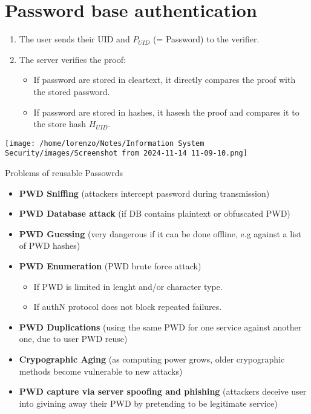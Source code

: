 \section{Password base authentication}
\begin{minipage}{0.5\textwidth}
    \begin{enumerate}
        \item The user sends their UID and \(P_{UID}\) (= Password) to the verifier.
        \item The server verifies the proof:
        \begin{itemize}
            \item If password are stored in cleartext, it directly compares the proof with the stored password.
            \item If password are stored in hashes, it hasesh the proof and compares it to the store hash \(H_{UID}\).
        \end{itemize}
    \end{enumerate}
\end{minipage} 
\hspace{1cm}
\begin{minipage}{0.5\textwidth}
    \centering
    \texttt{[image: /home/lorenzo/Notes/Information System Security/images/Screenshot from 2024-11-14 11-09-10.png]}
\end{minipage}

\begin{quotebox}[colframe=blue!10!white, colback=blue!5!white]{Problems of reusable Passowrds}
    \begin{itemize}
        \item \textbf{PWD Sniffing} (attackers intercept password during transmission)
        \item \textbf{PWD Database attack} (if DB contains plaintext or obfuscated PWD)
        \item \textbf{PWD Guessing} (very dangerous if it can be done offline, e.g against a list of PWD hashes)
        \item \textbf{PWD Enumeration} (PWD brute force attack)
        \begin{itemize}
            \item If PWD is limited in lenght and/or character type.
            \item If authN protocol does not block repeated failures.
        \end{itemize}
        \item \textbf{PWD Duplications} (using the same PWD for one service against another one, due to user PWD reuse)
        \item \textbf{Crypographic Aging} (as computing power grows, older crypographic methods become vulnerable to new attacks)
        \item \textbf{PWD capture via server spoofing and phishing} (attackers deceive user into givining away their PWD by pretending to be legitimate service)
    \end{itemize} 
\end{quotebox}

